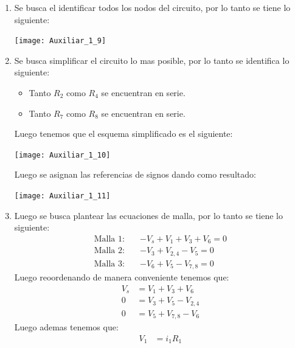\documentclass[
  11pt,
  letterpaper,
   addpoints,
  ]{exam}
\begin{document}
\begin{solution}
    \begin{enumerate}
        \item Se busca el identificar todos los nodos del circuito, por lo tanto se tiene lo siguiente:
        \begin{center}
            \texttt{[image: Auxiliar\_1\_9]}
        \end{center}
        \item Se busca simplificar el circuito lo mas posible, por lo tanto se identifica lo siguiente:
        \begin{itemize}
            \item Tanto $R_2$ como $R_4$ se encuentran en serie.
            \item Tanto $R_7$ como $R_8$ se encuentran en serie.
        \end{itemize}
        Luego tenemos que el esquema simplificado es el siguiente:
    \begin{center}
        \texttt{[image: Auxiliar\_1\_10]}
    \end{center}
    Luego se asignan las referencias de signos dando como resultado:
    \begin{center}
        \texttt{[image: Auxiliar\_1\_11]}
    \end{center}
    \item Luego se busca plantear las ecuaciones de malla, por lo tanto se tiene lo siguiente:
    \begin{align}
        \text{Malla 1:} \quad & -V_s + V_1 + V_3 + V_6 = 0 \\
        \text{Malla 2:} \quad & - V_3 + V_{2,4} - V_5 = 0 \\
        \text{Malla 3:} \quad & -V_6 + V_5 - V_{7,8} = 0 
    \end{align}
    Luego reoordenando de manera conveniente tenemos que:
    \begin{align}
        V_s &= V_1 + V_3 + V_6 \\
        0 &= V_3 + V_5 - V_{2,4} \\
        0 &= V_5 + V_{7,8} - V_6 
    \end{align}
    Luego ademas tenemos que:
    \begin{align}
        V_1 &= i_1 R_1 \\

\end{align}
\end{enumerate}
\end{solution}
\end{document}
